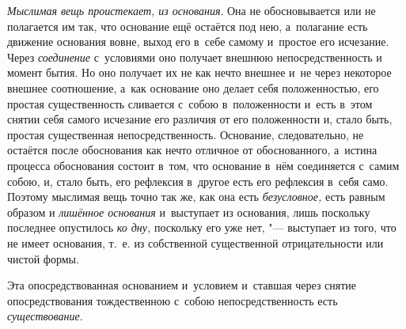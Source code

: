 {\em Мыслимая вещь проистекает, из основания}. Она не обосновывается или не
полагается им так, что основание ещё остаётся под нею, а~полагание есть
движение основания вовне, выход его в~себе самому и~простое его исчезание.
Через {\em соединение} с~условиями оно получает внешнюю непосредственность и
момент бытия. Но оно получает их не как нечто внешнее и~не через некоторое
внешнее соотношение, а~как основание оно делает себя положенностью, его простая
существенность сливается с~собою в~положенности и~есть в~этом снятии себя
самого исчезание его различия от его положенности и, стало быть, простая
существенная непосредственность. Основание, следовательно, не остаётся после
обоснования как нечто отличное от обоснованного, а~истина процесса обоснования
состоит в~том, что основание в~нём соединяется с~самим собою, и, стало быть,
его рефлексия в~другое есть его рефлексия в~себя само. Поэтому мыслимая вещь
точно так же, как она есть {\em безусловное,} есть равным образом
и {\em лишённое основания} и~выступает из основания, лишь поскольку последнее
опустилось {\em ко дну,} поскольку его уже нет, "--- выступает из того, что не
имеет основания, т.~е. из собственной существенной отрицательности или
чистой формы.

Эта опосредствованная основанием и~условием и~ставшая через снятие
опосредствования тождественною с~собою непосредственность есть
{\em существование}.

\bigskip

